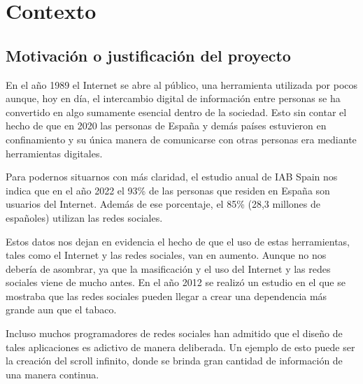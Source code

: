 \chapter{Contexto}\label{ch:context}

\section{Motivación o justificación del proyecto}

\vspace{0.3cm}

\indent En el año 1989 el Internet se abre al público, una herramienta utilizada por pocos aunque, hoy en día, el intercambio digital de información entre personas se ha convertido en algo sumamente esencial dentro de la sociedad. Esto sin contar el hecho de que en 2020 las personas de España y demás países estuvieron en confinamiento y su única manera de comunicarse con otras personas era mediante herramientas digitales.

\vspace{0.3cm}

Para podernos situarnos con más claridad, el estudio anual de IAB Spain nos indica que en el año 2022 el 93\% de las personas que residen en España son usuarios del Internet. Además de ese porcentaje, el 85\% (28,3 millones de españoles) utilizan las redes sociales. \cite{Studio-Aloha}

\vspace{0.3cm}

Estos datos nos dejan en evidencia el hecho de que el uso de estas herramientas, tales como el Internet y las redes sociales, van en aumento. Aunque no nos debería de asombrar, ya que la masificación y el uso del Internet y las redes sociales viene de mucho antes. En el año 2012 se realizó un estudio en el que se mostraba que las redes sociales pueden llegar a crear una dependencia más grande aun que el tabaco. \cite{Tabaco-Study}

\vspace{0.3cm}

Incluso muchos programadores de redes sociales han admitido que el diseño de tales aplicaciones es adictivo de manera deliberada. Un ejemplo de esto puede ser la creación del scroll infinito, donde se brinda gran cantidad de información de una manera continua. \cite{Social-Deliberately}

\vspace{0.3cm}

